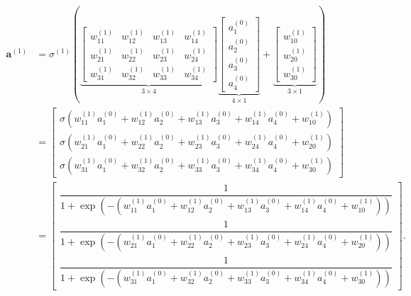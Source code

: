 \begin{align}
    \mathbf{a}^{(1)} 
    &= \sigma^{(1)} \left( 
        \underbrace{\begin{bmatrix} 
            w_{11}^{(1)} & w_{12}^{(1)} & w_{13}^{(1)} & w_{14}^{(1)} \\ 
            w_{21}^{(1)} & w_{22}^{(1)} & w_{23}^{(1)} & w_{24}^{(1)} \\ 
            w_{31}^{(1)} & w_{32}^{(1)} & w_{33}^{(1)} & w_{34}^{(1)} 
        \end{bmatrix}}_{3 \times 4} 
        \underbrace{\begin{bmatrix} a_1^{(0)} \\ a_2^{(0)} \\ a_3^{(0)} \\ a_4^{(0)} \end{bmatrix}}_{4 \times 1} 
        + \underbrace{\begin{bmatrix} w_{10}^{(1)} \\ w_{20}^{(1)} \\ w_{30}^{(1)} \end{bmatrix}}_{3 \times 1} 
    \right) \nonumber \\[1.5ex]
    &= \begin{bmatrix} 
        \sigma\left( w_{11}^{(1)} a_1^{(0)} + w_{12}^{(1)} a_2^{(0)} + w_{13}^{(1)} a_3^{(0)} + w_{14}^{(1)} a_4^{(0)} + w_{10}^{(1)} \right) \\[1.2ex] 
        \sigma\left( w_{21}^{(1)} a_1^{(0)} + w_{22}^{(1)} a_2^{(0)} + w_{23}^{(1)} a_3^{(0)} + w_{24}^{(1)} a_4^{(0)} + w_{20}^{(1)} \right) \\[1.2ex] 
        \sigma\left( w_{31}^{(1)} a_1^{(0)} + w_{32}^{(1)} a_2^{(0)} + w_{33}^{(1)} a_3^{(0)} + w_{34}^{(1)} a_4^{(0)} + w_{30}^{(1)} \right) 
    \end{bmatrix} \nonumber \\[1.5ex]
    &= \begin{bmatrix} 
        \dfrac{1}{1 + \exp\left(-\left(w_{11}^{(1)} a_1^{(0)} + w_{12}^{(1)} a_2^{(0)} + w_{13}^{(1)} a_3^{(0)} + w_{14}^{(1)} a_4^{(0)} + w_{10}^{(1)}\right)\right)} \\[2.8ex] 
        \dfrac{1}{1 + \exp\left(-\left(w_{21}^{(1)} a_1^{(0)} + w_{22}^{(1)} a_2^{(0)} + w_{23}^{(1)} a_3^{(0)} + w_{24}^{(1)} a_4^{(0)} + w_{20}^{(1)}\right)\right)} \\[2.8ex] 
        \dfrac{1}{1 + \exp\left(-\left(w_{31}^{(1)} a_1^{(0)} + w_{32}^{(1)} a_2^{(0)} + w_{33}^{(1)} a_3^{(0)} + w_{34}^{(1)} a_4^{(0)} + w_{30}^{(1)}\right)\right)} 
    \end{bmatrix}.
\end{align}
